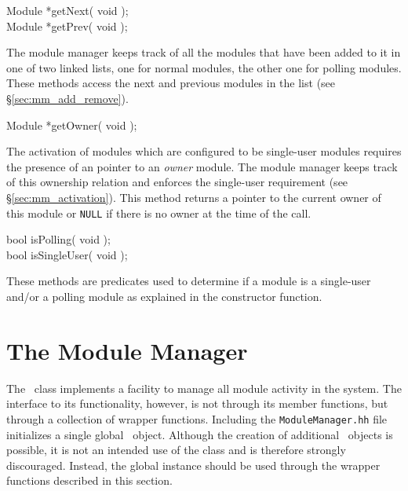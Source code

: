 \begin{prototype}
Module *getNext( void );\\
Module *getPrev( void );
\end{prototype}

The module manager keeps track of all the modules that have been added to it
in one of two linked lists, one for normal modules, the other one for
polling modules. These methods access the next and previous
modules in the list (see \S\ref{sec:mm_add_remove}).

\begin{prototype}
Module *getOwner( void );
\end{prototype}

The activation of modules which are configured to be single-user modules
requires the presence of an pointer to an {\it owner} module. The module
manager keeps track of this ownership relation and enforces the single-user
requirement (see \S\ref{sec:mm_activation}). This method returns a pointer
to the current owner of this module or {\tt NULL} if there is no owner at
the time of the call.

\begin{prototype}
bool isPolling( void );\\
bool isSingleUser( void );
\end{prototype}

These methods are predicates used to determine if a module is a single-user
and/or a polling module as explained in the constructor function.

\section{The Module Manager}
\label{sec:mm_info}

The \ModuleManager\ class implements a facility to manage all module
activity in the system. The interface to its functionality, however, is not
through its member functions, but through a collection of wrapper
functions. Including the {\tt ModuleManager.hh} file initializes a single
global \ModuleManager\ object. Although the creation of additional
\ModuleManager\ objects is possible, it is not an intended use of the class
and is therefore strongly discouraged. Instead, the global instance
should be used through the wrapper functions described in this section.

